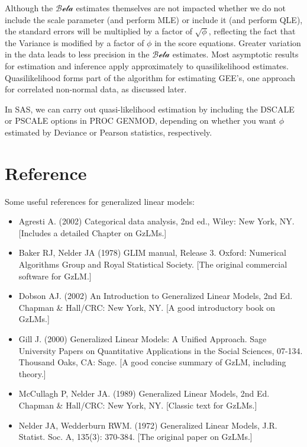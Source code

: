 \documentclass[
  9pt,
  ignorenonframetext,
]{beamer}
\begin{document}
\begin{frame}{}
\protect\hypertarget{section-12}{}
Although the \(\mathcal {Beta}\) estimates themselves are not impacted
whether we do not include the scale parameter (and perform MLE) or
include it (and perform QLE), the standard errors will be multiplied by
a factor of \(\sqrt \phi\), reflecting the fact that the Variance is
modified by a factor of \(\phi\) in the score equations. Greater
variation in the data leads to less precision in the \(\mathcal {Beta}\)
estimates. Most asymptotic results for estimation and inference apply
approximately to quasilikelihood estimates. Quasilikelihood forms part
of the algorithm for estimating GEE's, one approach for correlated
non-normal data, as discussed later.

In SAS, we can carry out quasi-likelihood estimation by including the
DSCALE or PSCALE options in PROC GENMOD, depending on whether you want
\(\phi\) estimated by Deviance or Pearson statistics, respectively.
\end{frame}

\hypertarget{reference}{%
\section{Reference}\label{reference}}

\begin{frame}{Some useful references for generalized linear models:}
\protect\hypertarget{some-useful-references-for-generalized-linear-models}{}
\begin{itemize}
\item
  Agresti A. (2002) Categorical data analysis, 2nd ed., Wiley: New York,
  NY. {[}Includes a detailed Chapter on GzLMs.{]}
\item
  Baker RJ, Nelder JA (1978) GLIM manual, Release 3. Oxford: Numerical
  Algorithms Group and Royal Statistical Society. {[}The original
  commercial software for GzLM.{]}
\item
  Dobson AJ. (2002) An Introduction to Generalized Linear Models, 2nd
  Ed. Chapman \& Hall/CRC: New York, NY. {[}A good introductory book on
  GzLMs.{]}
\item
  Gill J. (2000) Generalized Linear Models: A Unified Approach. Sage
  University Papers on Quantitative Applications in the Social Sciences,
  07-134. Thousand Oaks, CA: Sage. {[}A good concise summary of GzLM,
  including theory.{]}
\item
  McCullagh P, Nelder JA. (1989) Generalized Linear Models, 2nd Ed.
  Chapman \& Hall/CRC: New York, NY. {[}Classic text for GzLMs.{]}
\item
  Nelder JA, Wedderburn RWM. (1972) Generalized Linear Models, J.R.
  Statist. Soc. A, 135(3): 370-384. {[}The original paper on GzLMs.{]}
\end{itemize}
\end{frame}
\end{document}

